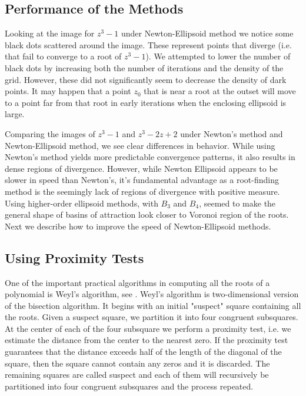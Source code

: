 \documentclass{article}
\begin{document}
\subsection{Performance of the Methods}
Looking at the image for $z^3-1$ under Newton-Ellipsoid method we notice some black dots scattered around the image. These represent points that diverge (i.e. that fail to converge to a root of $z^3-1$). We attempted to lower the number of black dots by increasing both the number of iterations and the density of the grid. However, these did not significantly seem to decrease the density of dark points. It may happen that a point $z_0$ that is near a root at the outset will move to a point far from that root in early iterations when the enclosing ellipsoid is large.

Comparing the images of $z^3-1$ and $z^3-2z+2$ under Newton's method and Newton-Ellipsoid method, we see clear differences in behavior. While using Newton's method yields more predictable convergence patterns, it also results in dense regions of divergence. However, while Newton Ellipsoid appears to be slower in speed than Newton's, it's fundamental advantage as a root-finding method is the seemingly lack of regions of divergence with positive measure. Using higher-order ellipsoid methods, with $B_3$ and $B_4$, seemed to make the general shape of basins of attraction look closer to Voronoi region of the roots. Next we describe how to improve the speed of Newton-Ellipsoid methods.

\subsection{Using Proximity Tests}

One of the important practical algorithms in computing all the roots of a polynomial is Weyl's algorithm, see \cite{pan97}.  Weyl's algorithm is two-dimensional version of the bisection algorithm. It begins with an
initial "suspect" square containing all the roots. Given a suspect square, we
partition it into four congruent subsquares. At the center of each of the
four subsquare we perform a proximity test, i.e. we estimate the distance
from the center to the nearest zero. If the proximity test guarantees that
the distance exceeds half of the length of the diagonal of the square, then the square cannot contain any zeros and it is discarded. The remaining
squares are called suspect and each of them will recursively be partitioned into four congruent subsquares and the process repeated.
\end{document}
